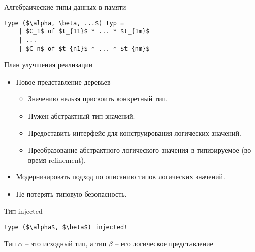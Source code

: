 \documentclass[10pt, mathserif]{beamer}
\theoremstyle{definition}
\begin{document}

\begin{frame}[fragile]{Алгебраические типы данных в памяти}
  \centering
  \begin{lstlisting}[mathescape=true]
    type ($\alpha, \beta, ...$) typ =   
    | $C_1$ of $t_{11}$ * ... * $t_{1m}$  
    | ...
    | $C_n$ of $t_{n1}$ * ... * $t_{nm}$  
  \end{lstlisting}
  \pause
  \vspace{3em}
  

\end{frame}



\begin{frame}[fragile]{План улучшения реализации}
  \begin{itemize}
  \item Новое представление деревьев
    \begin{itemize}
      \item Значению нельзя присвоить конкретный тип.
      \item Нужен абстрактный тип значений.
      \item Предоставить интерфейс для конструирования логических значений.
      \item Преобразование абстрактного логического значения в типизируемое (во время refinement).
    \end{itemize}
  \item Модернизировать подход по описанию типов логических значений.
  \item Не потерять типовую безопасность.
  \end{itemize}
\end{frame}

\begin{frame}[fragile]{Тип injected}
  \begin{lstlisting}[mathescape=true]
  type ($\alpha$, $\beta$) injected!
  \end{lstlisting}

\vskip 1cm
  Тип $\alpha$ -- это исходный тип, а тип $\beta$ -- его логическое представление
\end{frame}
\end{document}

